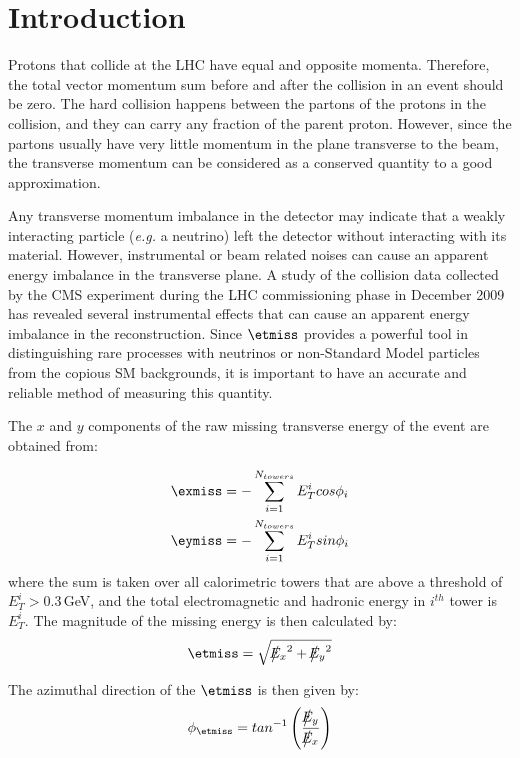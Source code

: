 \section{Introduction}
Protons that collide at the LHC have equal and
opposite momenta. Therefore, the total vector momentum sum before and
after the collision in an event
should be zero. The hard collision happens between the partons of the
protons in the collision, and they can carry any fraction of the parent
proton. However, since the partons usually have very
little momentum in the plane transverse to the beam, the transverse
momentum can be considered as a conserved quantity to a good
approximation. 

Any transverse momentum imbalance in the detector may indicate that a
weakly interacting particle (\textit{e.g.} a neutrino) left the
detector without interacting with its material. However, instrumental or
beam related noises can cause an apparent energy imbalance in the
transverse plane. A study of the collision data collected by the CMS
experiment during the LHC commissioning phase in December 2009 has
revealed several instrumental effects that can cause an apparent energy
imbalance in the reconstruction. Since $\etmiss$ provides a powerful
tool in distinguishing rare processes with neutrinos or non-Standard
Model particles from the copious SM backgrounds, it is important to have an accurate and reliable method
of measuring this quantity. 

The $x$ and $y$ components of the raw missing transverse energy of the
event are obtained from:

\begin{align}
  \label{eq:32}
  \exmiss&=-\sum\limits^{N_{towers}}_{i=1}E_T^icos\phi_i\\
  \label{eq:33}
  \eymiss&=-\sum\limits^{N_{towers}}_{i=1}E_T^isin\phi_i
\end{align}
where the sum is taken over all calorimetric towers that are above a threshold of
$E_T^i>0.3$\,GeV, and the total electromagnetic and hadronic energy in $i^{th}$
tower is $E_T^i$. The magnitude of the missing energy is then calculated
by:
\begin{equation}
  \etmiss=\sqrt{\big\slash\hspace{-1.6ex}{E_x}^2+\big\slash\hspace{-1.6ex}{E_y}^2}
\end{equation}

The azimuthal direction of the $\etmiss$ is then given by:
\begin{equation}
  \phi_{\etmiss}=tan^{-1}\left(\frac{\big\slash\hspace{-1.6ex}{E_y}}{\big\slash\hspace{-1.6ex}{E_x}}\right)
\end{equation}

